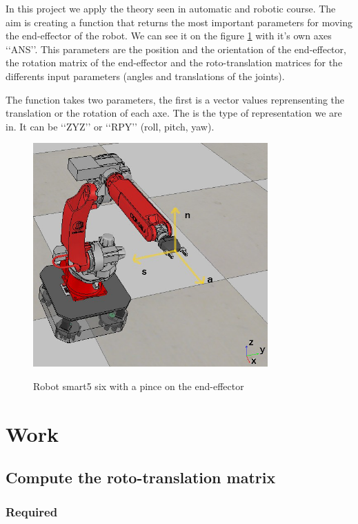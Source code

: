 \documentclass[english,a4paper,11pt]{report}
\begin{document}
	In this project we apply the theory seen in automatic and robotic course.
	The aim is creating a function that returns the most important parameters for moving the end-effector of the robot. We can see it on the figure \ref{endEf} with it\rq{}s own axes \lq\lq{}ANS\rq\rq{}. This parameters are the position and the orientation of the end-effector, the rotation matrix of the end-effector and the roto-translation matrices for the differents input parameters (angles and translations of the joints).
	
	The function takes two parameters, the first is a vector values reprensenting the translation or the rotation of each axe. The is the type of representation we are in. It can be \lq\lq{}ZYZ\rq\rq{} or \lq\lq{}RPY\rq\rq{} (roll, pitch, yaw).
	\begin{figure}[h]
	\center
		\includegraphics[width=9cm]{images_not_compressed/endEffector.png}
		\label{endEf}
		\caption{Robot smart5 six with a pince on the end-effector}
	\end{figure}

	\chapter{Work}
	\section{Compute the roto-translation matrix}
	\subsection{Required}
	
	
	
\end{document}
